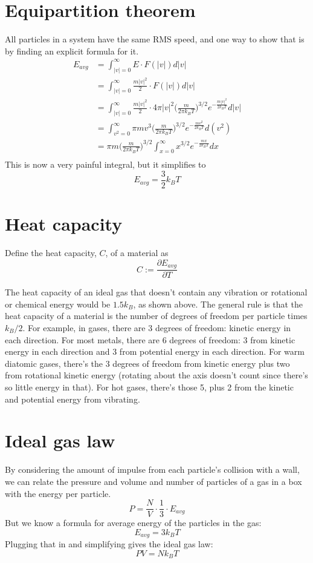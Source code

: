 \documentclass[12pt]{article}
\begin{document}
\section{Equipartition theorem}
All particles in a system have the same RMS speed, and one way to show that is by finding an explicit formula for it.
\begin{align*}
    E_{avg} &= \int_{|v|=0}^\infty E \cdot F(|v|) d|v| \\
    &= \int_{|v|=0}^\infty \frac{m |v|^2}{2}  \cdot F(|v|) d|v| \\
    &= \int_{|v|=0}^\infty \frac{m |v|^2}{2} \cdot 4 \pi |v|^2 \Big( \frac{m}{2 \pi k_B T} \Big)^{3/2} e^{-\frac{m |v|^2}{2 k_B T}} d|v| \\
    &= \int_{v^2=0}^\infty \pi m v^3 \Big( \frac{m}{2 \pi k_B T} \Big)^{3/2} e^{-\frac{m v^2}{2 k_B T}} d(v^2) \\
    &= \pi m \Big( \frac{m}{2 \pi k_B T} \Big)^{3/2} \int_{x=0}^\infty x^{3/2} e^{-\frac{m x}{2 k_B T}} dx \\
\end{align*}
This is now a very painful integral, but it simplifies to
\[E_{avg} = \frac{3}{2} k_B T\]

\section{Heat capacity}
Define the heat capacity, $C$, of a material as
\[C := \frac{\partial E_{avg}}{\partial T} \]

The heat capacity of an ideal gas that doesn't contain any vibration or rotational or chemical energy would be $1.5 k_B$, as shown above. The general rule is that the heat capacity of a material is the number of degrees of freedom per particle times $k_B / 2$. For example, in gases, there are 3 degrees of freedom: kinetic energy in each direction. For most metals, there are 6 degrees of freedom: 3 from kinetic energy in each direction and 3 from potential energy in each direction. For warm diatomic gases, there's the 3 degrees of freedom from kinetic energy plus two from rotational kinetic energy (rotating about the axis doesn't count since there's so little energy in that). For hot gases, there's those 5, plus 2 from the kinetic and potential energy from vibrating.

\section{Ideal gas law}
By considering the amount of impulse from each particle's collision with a wall, we can relate the pressure and volume and number of particles of a gas in a box with the energy per particle.
\[P = \frac{N}{V} \cdot \frac{1}{3} \cdot E_{avg} \]
But we know a formula for average energy of the particles in the gas:
\[E_{avg} = 3 k_B T\]
Plugging that in and simplifying gives the ideal gas law:
\[P V = N k_B T\]
\end{document}
